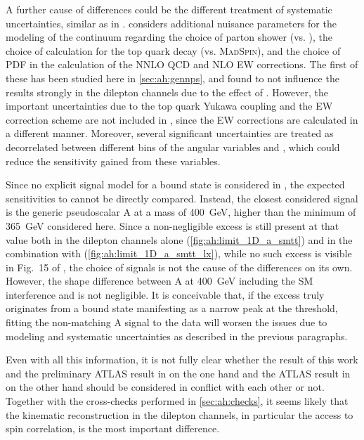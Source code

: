 A further cause of differences could be the different treatment of systematic uncertainties, similar as in .  considers additional nuisance parameters for the modeling of the \ttbar continuum regarding the choice of parton shower (\pythia vs. \herwig), the choice of calculation for the top quark decay (\powheg vs. \textsc{MadSpin}), and the choice of PDF in the calculation of the NNLO QCD and NLO EW corrections. The first of these has been studied here in \cref{sec:ah:gennps}, and found to not influence the results strongly in the dilepton channels due to the effect of \chel. However, the important uncertainties due to the top quark Yukawa coupling and the EW correction scheme are not included in , since the EW corrections are calculated in a different manner. Moreover, several significant uncertainties are treated as decorrelated between different bins of the angular variables \cost and \dphill, which could reduce the sensitivity gained from these variables.

Since no explicit signal model for a \ttbar bound state is considered in , the expected sensitivities to \etat cannot be directly compared. Instead, the closest considered signal is the generic pseudoscalar A at a mass of \SI{400}{\GeV}, higher than the minimum of \SI{365}{\GeV} considered here. Since a non-negligible excess is still present at that value both in the dilepton channels alone (\cref{fig:ah:limit_1D_a_smtt}) and in the combination with \ljets (\cref{fig:ah:limit_1D_a_smtt_lx}), while no such excess is visible in Fig.~15 of , the choice of signals is not the cause of the differences on its own. However, the shape difference between A at \SI{400}{\GeV} including the SM interference and \etat is not negligible. It is conceivable that, if the excess truly originates from a \ttbar bound state manifesting as a narrow peak at the \ttbar threshold, fitting the non-matching A signal to the data will worsen the issues due to modeling and systematic uncertainties as described in the previous paragraphs.

Even with all this information, it is not fully clear whether the result of this work and the preliminary ATLAS result in  on the one hand and the ATLAS result in  on the other hand should be considered in conflict with each other or not. Together with the cross-checks performed in \cref{sec:ah:checks}, it seems likely that the \ttbar kinematic reconstruction in the dilepton channels, in particular the access to spin correlation, is the most important difference.

